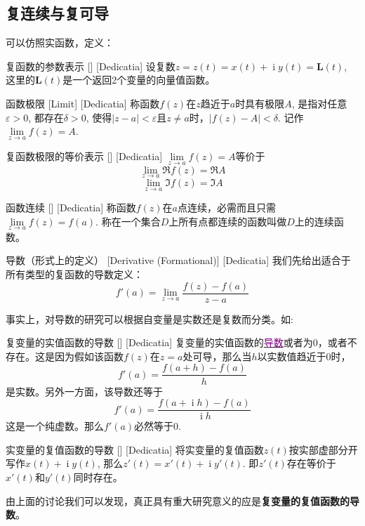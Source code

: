 \documentclass[UTF8]{ctexart}
\newcommand{\hyperrefc}[2]{\hyperref[#1]{\textcolor{purple}{#2}}}
\DeclareMathOperator{\ii}{\mathrm{i}}
\begin{document}
\subsection{复连续与复可导}
可以仿照实函数，定义：
\begin{dfn}
    [UUID]
    {复函数的参数表示}
    []
    [Dedicatia]
    设复数$z=z(t)=x(t)+\ii y(t)=\bm{L}(t)$, 这里的$\bm{L}(t)$是一个返回2个变量的向量值函数。
\end{dfn}
\begin{dfn}
    [UUID]
    {函数极限}
    [Limit]
    [Dedicatia]
    称函数$f(z)$在$z$趋近于$a$时具有极限$A$, 是指对任意$\varepsilon>0$, 都存在$\delta>0$, 使得$|z-a|<\varepsilon$且$z\neq a$时，$|f(z)-A|<\delta$. 记作$\lim\limits_{z\to a}f(z)=A$.
\end{dfn}
\begin{ppt}
    [UUID]
    {复函数极限的等价表示}
    []
    [Dedicatia]
    $\lim\limits_{z\to a}f(z)=A$等价于
    \[\lim_{z\to a}\Re f(z)=\Re A\]
    \[\lim_{z\to a}\Im f(z)=\Im A\]
\end{ppt}
\begin{dfn}
    [UUID]
    {函数连续}
    []
    [Dedicatia]
    称函数$f(z)$在$a$点连续，必需而且只需$\lim\limits_{z\to a}f(z)=f(a)$. 称在一个集合$D$上所有点都连续的函数叫做$D$上的连续函数。
\end{dfn}
\begin{dfn}
    [UUID]
    {导数（形式上的定义）\label{dfn:Derivative}}
    [Derivative (Formational)]
    [Dedicatia]
    我们先给出适合于所有类型的复函数的导数定义：
    \[f'(a)=\lim_{z\to a}\frac{f(z)-f(a)}{z-a}\]
\end{dfn}
事实上，对导数的研究可以根据自变量是实数还是复数而分类。如:
\begin{crl}
    [UUID]
    {复变量的实值函数的导数}
    []
    [Dedicatia]
    复变量的实值函数的\hyperrefc{dfn:Derivative}{导数}或者为0，或者不存在。这是因为假如该函数$f(z)$在$z=a$处可导，那么当$h$以实数值趋近于0时，
    \[f'(a)=\frac{f(a+h)-f(a)}{h}\]
    是实数。另外一方面，该导数还等于
    \[f'(a)=\frac{f(a+\ii h)-f(a)}{\ii h}\]
    这是一个纯虚数。那么$f'(a)$必然等于0.
\end{crl}
\begin{xmp}
    [UUID]
    {实变量的复值函数的导数}
    []
    [Dedicatia]
    将实变量的复值函数$z(t)$按实部虚部分开写作$x(t)+\ii y(t)$, 那么$z'(t)=x'(t)+\ii y'(t)$. 即$z'(t)$存在等价于$x'(t)$和$y'(t)$同时存在。
\end{xmp}
由上面的讨论我们可以发现，真正具有重大研究意义的应是\textbf{复变量的复值函数的导数}。
\end{document}
